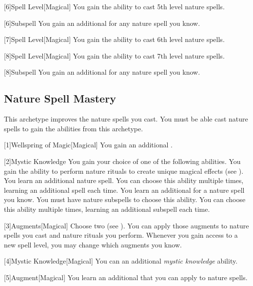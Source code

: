         [6]{Spell Level}[Magical] You gain the ability to cast 5th level nature spells.

        [6]{Subspell} You gain an additional  for any nature spell you know.

        [7]{Spell Level}[Magical] You gain the ability to cast 6th level nature spells.

        [8]{Spell Level}[Magical] You gain the ability to cast 7th level nature spells.

        [8]{Subspell} You gain an additional  for any nature spell you know.

    \subsection{Nature Spell Mastery}
        This archetype improves the nature spells you cast.
        You must be able cast nature spells to gain the abilities from this archetype.

        [1]{Wellspring of Magic}[Magical]
        You gain an additional .

        [2]{Mystic Knowledge}
        You gain your choice of one of the following abilities.
        {
             You gain the ability to perform nature rituals to create unique magical effects (see ).
             You learn an additional nature spell.
                You can choose this ability multiple times, learning an additional spell each time.
             You learn an additional  for a nature spell you know.
                You must have nature subspells to choose this ability.
                You can choose this ability multiple times, learning an additional subspell each time.
        }

        [3]{Augments}[Magical]
        Choose two  (see ).
        You can apply those augments to nature spells you cast and nature rituals you perform.
        Whenever you gain access to a new spell level, you may change which augments you know.

        [4]{Mystic Knowledge}[Magical]
        You can an additional \textit{mystic knowledge} ability.

        [5]{Augment}[Magical]
        You learn an additional  that you can apply to nature spells.

